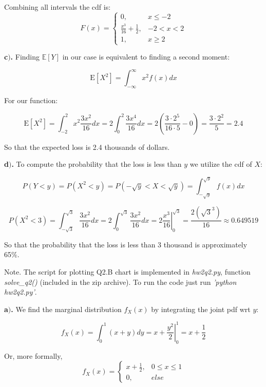 \documentclass[a4 paper]{article}
\begin{document}
Combining all intervals the cdf is:
$$
F(x)=\begin{cases}
0, & x\leq-2\\
\frac{x^{3}}{16}+\frac{1}{2}, & -2<x<2\\
1, & x\geq2
\end{cases}
$$ \newline



\textbf{c$)$.} Finding $\mathbb{E}[Y]$ in our case
is equivalent to finding a second moment:

$$
\mathrm{E}\left[X^{2}\right]=\int_{-\infty}^{\infty}x^{2} f(x) d x
$$

For our function:

$$
\mathrm{E}\left[X^{2}\right]=\int_{-2}^{2}x^{2} \frac{3x^{2}}{16} d x = 2\int_{0}^{2}\frac{3x^{4}}{16}dx=2(\frac{3\cdot2^{5}}{16\cdot5}-0)=\frac{3\cdot2^{2}}{5}=2.4
$$

So that the expected loss is 2.4 thousands of dollars. \newline


\textbf{d$)$.} To compute the probability that 
the loss is less than $y$ we utilize the cdf of $X$:

$$
P(Y<y)=P(X^{2}<y)=P(-\sqrt{y}<X<\sqrt{y})=\int_{-\sqrt{y}}^{\sqrt{y}}f(x)dx
$$

$$
P(X^{2}<3)=\int_{-\sqrt{3}}^{\sqrt{3}}\frac{3x^{2}}{16}dx=2\int_{0}^{\sqrt{3}}\frac{3x^{2}}{16}dx=\left.2\frac{x^{3}}{16}\right|_{0}^{\sqrt{3}}=\frac{2(\sqrt{3}^{3})}{16}\approx0.649519
$$

So that the probability that the loss is less than 3 
thousand is approximately 65\%. \newline

Note. The script for plotting Q2.B chart is implemented in 
\textit{hw2q2.py}, function \textit{solve\_q2()} 
(included in the zip archive). To run the code just run 
\textit{'python hw2q2.py'}.





\textbf{a$)$.} We find the marginal distribution $f_X(x)$
by integrating the joint pdf wrt $y$:

$$
f_{X}(x)=\int_{0}^{1}(x+y)dy=x+\left.\frac{y^{2}}{2}\right|_{0}^{1}=x+\frac{1}{2}
$$

Or, more formally,
$$
f_{X}(x)=\begin{cases}
	x+\frac{1}{2}, & 0\leq x\leq1\\
	0, & else
\end{cases}
$$
\end{document}
